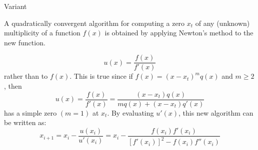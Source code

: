 \documentclass[12pt]{beamer}
\begin{document}
\begin{frame}{Variant} 

A quadratically convergent algorithm for computing a zero $x_t$ of any
(unknown) multiplicity of a function $f(x)$ is obtained by applying
Newton’s method to the new function.

\[
u(x) = \frac{f(x)}{f'(x)} 
\] 
\noindent 
rather than to $f(x)$. This is true since if $f(x) = (x-x_t)^m q(x)$ and $m \geq 2$, then 
\[
u(x) = \frac{f(x)}{f'(x)} = \frac{(x - x_t) q(x) }{ m q(x) + (x - x_t) q'(x)}
\] 
\noindent 
has a simple zero $(m=1)$ at $x_t$. By evaluating $u'(x)$, this new algorithm can be written as: 
\[
x_{i+1} = x_i - \frac{u(x_i)}{u'(x_i)} = x_i - \frac{f(x_i)f'(x_i)}{[f'(x_i)]^2 - f(x_i)f''(x_i)}
\]

\end{frame} 
\end{document}
